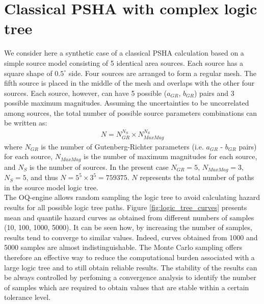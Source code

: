 \section{Classical PSHA with complex logic tree}
We consider here a synthetic case of a classical PSHA calculation based on a simple source model consisting of 5 identical area sources. Each source has a square shape of $0.5^{\circ}$ side. Four sources are arranged to form a regular mesh. The fifth source is placed in the middle of the mesh and overlaps with the other
four sources. Each source, however, can have 5 possible ($a_{GR}$, $b_{GR}$) pairs and 3 possible
maximum magnitudes. Assuming the uncertainties to be uncorrelated among sources, the total number of
possible source parameters combinations can be written as:
\begin{align}
N = N_{GR}^{N_{S}} \times N_{MaxMag}^{N_{S}}
\end{align}
where $N_{GR}$ is the number of Gutenberg-Richter parameters (i.e. $a_{GR}$ - $b_{GR}$ pairs) for each
source, $N_{MaxMag}$ is the number of maximum magnitudes for each source, and $N_{S}$ is the number
of sources. In the present case $N_{GR}=5$, $N_{MaxMag}=3$, $N_{S}=5$, and thus $N=5^{5} \times 3^{5}=759375$. $N$ represents the total number of paths in the source model logic tree.\\
The OQ-engine allows random sampling the logic tree to avoid calculating hazard results for all possible
logic tree paths. Figure \ref{fig:logic_tree_curves} presents mean and quantile hazard curves
as obtained from different numbers of samples (10, 100, 1000, 5000). It can be seen how, by increasing the number
of samples, results tend to converge to similar values. Indeed, curves obtained from 1000 and 5000 samples are almost indistinguishable. The Monte Carlo sampling offers therefore an effective way to reduce the computational burden associated with a large logic tree and to still obtain reliable results. The stability of the
results can be always controlled by perfoming a convergence analysis to identify the number of samples
which are required to obtain values that are stable within a certain tolerance level.
